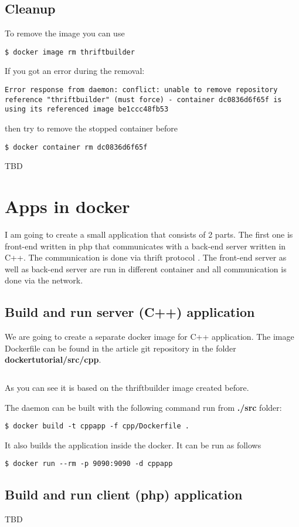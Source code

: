 \documentclass[14pt,a4paper]{article}
\begin{document}
\subsection{Cleanup}
To remove the image you can use
\begin{verbatim}
$ docker image rm thriftbuilder
\end{verbatim}
If you got an error during the removal:
\begin{verbatim}
Error response from daemon: conflict: unable to remove repository
reference "thriftbuilder" (must force) - container dc0836d6f65f is
using its referenced image be1ccc48fb53
\end{verbatim}
then try to remove the stopped container before
\begin{verbatim}
$ docker container rm dc0836d6f65f
\end{verbatim}
TBD

\section{Apps in docker}
I am going to create a small application that consists of 2 parts. The
first one is front-end written in php that communicates with a back-end server
written in C++. The communication is done via thrift protocol
\cite{apache:thrift}. The front-end server as well as back-end server
are run in different container and all communication is done via the
network. 

\subsection{Build and run server (C++) application}
We are going to create a separate docker image for C++ application.
The image Dockerfile can be found in the article git
repository \cite{github:articles_ivanmurashko} in the folder 
\textbf{dockertutorial/src/cpp}.
\inputminted{shell}{./src/cpp/Dockerfile}
As you can see it is based on the thriftbuilder image created before. 

The daemon can be built with the following command run from
\textbf{./src} folder:
\begin{verbatim}
$ docker build -t cppapp -f cpp/Dockerfile .
\end{verbatim}
It also builds the application inside the docker. It can be run as
follows
\begin{verbatim}
$ docker run --rm -p 9090:9090 -d cppapp
\end{verbatim}

\subsection{Build and run client (php) application}
TBD

  
     
\end{document}
